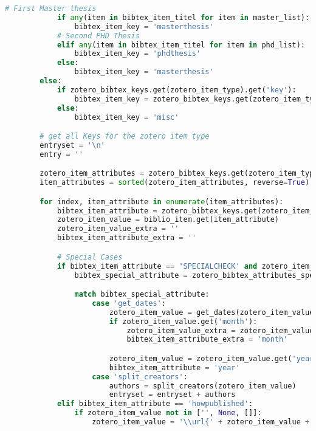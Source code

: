 \begin{lstlisting}[language=python, caption=Python LaTex - zotero - Zotero BibLaTex Importer,captionpos=b,label={lst:zotero},breaklines=true]
            # First Master thesis
            if any(item in bibtex_item_titel for item in master_list):
                bibtex_item_key = 'masterthesis'
            # Second PHD Thesis
            elif any(item in bibtex_item_titel for item in phd_list):
                bibtex_item_key = 'phdthesis'
            else:
                bibtex_item_key = 'masterthesis'
        else:
            if zotero_bibtex_keys.get(zotero_item_type).get('key'):
                bibtex_item_key = zotero_bibtex_keys.get(zotero_item_type).get('key')
            else:
                bibtex_item_key = 'misc'

        # get all Keys for the zotero item type
        entryset = '\n'
        entry = ''

        zotero_item_attributes = zotero_bibtex_keys.get(zotero_item_type).get('attributes').keys()
        item_attributes = sorted(zotero_item_attributes, reverse=True)

        for index, item_attribute in enumerate(item_attributes):
            bibtex_item_attribute = zotero_bibtex_keys.get(zotero_item_type).get('attributes').get(item_attribute)
            zotero_item_value = biblio_item.get(item_attribute)
            zotero_item_value_extra = ''
            bibtex_item_attribute_extra = ''

            # Special Cases
            if bibtex_item_attribute == 'SPECIALCHECK' and zotero_item_value not in ['', None]:
                bibtex_special_attribute = zotero_bibtex_attributes_special.get(item_attribute)

                match bibtex_special_attribute:
                    case 'get_dates':
                        zotero_item_value = get_dates(zotero_item_value, bibtex_item_key, bibtex_month_attributes)
                        if zotero_item_value.get('month'):
                            zotero_item_value_extra = zotero_item_value.get('month')
                            bibtex_item_attribute_extra = 'month'

                        zotero_item_value = zotero_item_value.get('year')
                        bibtex_item_attribute = 'year'
                    case 'split_creators':
                        authors = split_creators(zotero_item_value)
                        entryset = entryset + authors
            elif bibtex_item_attribute == 'howpublished':
                if zotero_item_value not in ['', None, []]:
                    zotero_item_value = '\\url{' + zotero_item_value + '}'


\end{lstlisting}
